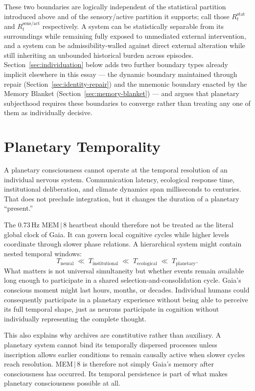 \documentclass[11pt]{article}
\begin{document}
These two boundaries are logically independent of the statistical partition introduced above and of the sensory/active partition it supports; call those $R^{\mathrm{stat}}_t$ and $R^{\mathrm{sens/act}}_t$ respectively. A system can be statistically separable from its surroundings while remaining fully exposed to unmediated external intervention, and a system can be admissibility-walled against direct external alteration while still inheriting an unbounded historical burden across episodes. Section~\ref{sec:individuation} below adds two further boundary types already implicit elsewhere in this essay --- the dynamic boundary maintained through repair (Section~\ref{sec:identity-repair}) and the mnemonic boundary enacted by the Memory Blanket (Section~\ref{sec:memory-blanket}) --- and argues that planetary subjecthood requires these boundaries to converge rather than treating any one of them as individually decisive.

\section{Planetary Temporality}

A planetary consciousness cannot operate at the temporal resolution of an individual nervous system. Communication latency, ecological response time, institutional deliberation, and climate dynamics span milliseconds to centuries. That does not preclude integration, but it changes the duration of a planetary ``present.''

The 0.73\,Hz MEM\,$|$\,8 heartbeat should therefore not be treated as the literal global clock of Gaia. It can govern local cognitive cycles while higher levels coordinate through slower phase relations. A hierarchical system might contain nested temporal windows:
\[
T_{\text{neural}} \;\ll\; T_{\text{institutional}} \;\ll\; T_{\text{ecological}} \;\ll\; T_{\text{planetary}}.
\]
What matters is not universal simultaneity but whether events remain available long enough to participate in a shared selection-and-consolidation cycle. Gaia's conscious moment might last hours, months, or decades. Individual humans could consequently participate in a planetary experience without being able to perceive its full temporal shape, just as neurons participate in cognition without individually representing the complete thought.

This also explains why archives are constitutive rather than auxiliary. A planetary system cannot bind its temporally dispersed processes unless inscription allows earlier conditions to remain causally active when slower cycles reach resolution. MEM\,$|$\,8 is therefore not simply Gaia's memory after consciousness has occurred. Its temporal persistence is part of what makes planetary consciousness possible at all.
\end{document}
